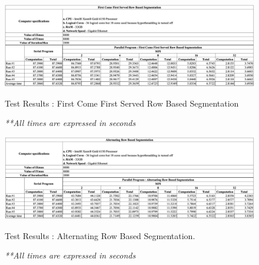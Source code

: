 \documentclass[conference]{IEEEtran}
\begin{document}
\newpage
\begin{figure}
	\centering
	\includegraphics[width=\textheight,height=\textwidth,keepaspectratio]{FCFSCal}
	\caption{Test Results : First Come First Served Row Based Segmentation}
	\label{app:f}
	\caption*{\emph{**All times are expressed in seconds}}
\end{figure}
\newpage
\begin{figure}
	\centering
	\includegraphics[width=\textheight,height=\textwidth,keepaspectratio]{AlCal}
	\caption{Test Results : Alternating Row Based Segmentation.}
	\label{app:a}
	\caption*{\emph{**All times are expressed in seconds}}
\end{figure}
\end{document}
